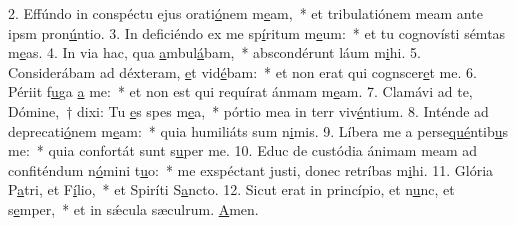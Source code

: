 2. Effúndo in conspéctu ejus orati\uline{ó}nem m\uline{e}am,~* et tribulatiónem meam ante ipsm pron\uline{ú}ntio.
3. In deficiéndo ex me sp\uline{í}ritum m\uline{e}um:~* et tu cognovísti sémtas m\uline{e}as.
4. In via hac, qua \uline{a}mbul\uline{á}bam,~* abscondérunt láum m\uline{i}hi.
5. Considerábam ad déxteram, \uline{e}t vid\uline{é}bam:~* et non erat qui cognscer\uline{e}t me.
6. Périit f\uline{u}ga \uline{a} me:~* et non est qui requírat ánmam m\uline{e}am.
7. Clamávi ad te, Dómine,~† dixi: Tu \uline{e}s spes m\uline{e}a,~* pórtio mea in terr viv\uline{é}ntium.
8. Inténde ad deprecati\uline{ó}nem m\uline{e}am:~* quia humiliáts sum n\uline{i}mis.
9. Líbera me a perse\uline{qué}ntib\uline{u}s me:~* quia confortát sunt s\uline{u}per me.
10. Educ de custódia ánimam meam ad confiténdum n\uline{ó}mini t\uline{u}o:~* me exspéctant justi, donec retríbas m\uline{i}hi.
11. Glória P\uline{a}tri, et F\uline{í}lio,~* et Spiríti S\uline{a}ncto.
12. Sicut erat in princípio, et n\uline{u}nc, et s\uline{e}mper,~* et in sǽcula sæculrum. \uline{A}men.
